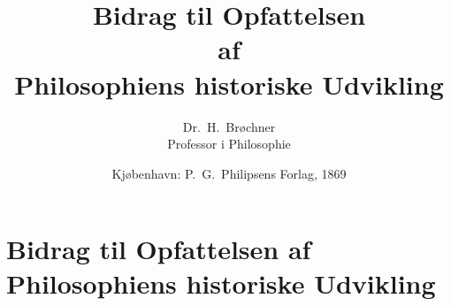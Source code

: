 \newcommand{\gk}[1]{\textit{#1}}

\pagestyle{fancy}
\fancyhf{}
\fancyhead[LE,RO]{\thepage}
\fancyhead[LO]{\textit{\leftmark}}


\title{\textbf{Bidrag til Opfattelsen}\\[2pt]
  \large af\\[6pt]
  \textbf{\Large Philosophiens historiske Udvikling}}
\author{Dr.\ H.\ Brøchner\\[4pt]
  \small Professor i Philosophie}
\date{Kjøbenhavn: P.\ G.\ Philipsens Forlag, 1869}

\usepackage{marginnote}
\newcommand{\opage}[1]{\marginnote{\footnotesize\textit{[#1]}}}
\newcommand{\apage}[1]{\marginnote{\footnotesize\textit{[#1]}}}

\maketitle
\thispagestyle{empty}
\newpage

%

\chapter*{Bidrag til Opfattelsen af Philosophiens historiske Udvikling}

